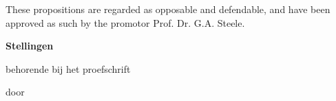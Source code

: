 \documentclass{dissertation-edit}
\begin{document}
\bigskip
\bigskip

\begin{center}
These propositions are regarded as opposable and defendable, and have been approved as such by the promotor Prof. Dr. G.A. Steele.
\end{center}

\clearpage
{

\begin{center}

{\Large\titlefont\bfseries Stellingen}

\bigskip

behorende bij het proefschrift

\bigskip

{\makeatletter
\titlestyle\bfseries\large\@title
\makeatother}

{\makeatletter
\ifx\@subtitle\undefined\else
    \titlefont\titleshape\@subtitle
\fi
\makeatother}

\bigskip

door

\bigskip

\makeatletter
{\large\titlefont\bfseries\@firstname\ {\titleshape\@lastname}}
\makeatother

\end{center}

\bigskip
\bigskip

\begin{enumerate}


\end{enumerate}}
\end{document}
